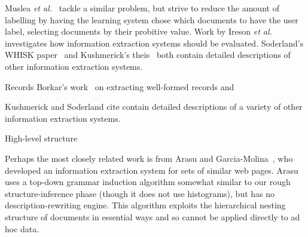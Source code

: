 Muslea {\em et al.}~\cite{muslea+:active-learning} tackle a similar
problem, but strive to reduce the amount of labelling by having the
learning system chose which documents to have the user label,
selecting documents by their probitive value.  Work by Ireson {\em et
al.}~\cite{ireson+:ml-evaluation} investigates how information
extraction systems should be evaluated.  Soderland's WHISK
paper~\cite{soderland:whisk} and Kushmerick's
theis~\cite{kushmerick-phd1997} both contain detailed descriptions of
other information extraction systems.




Records
Borkar's work~\cite{borkar+:text-segmentation} on extracting well-formed
records and 

Kushmerick and Soderland cite contain detailed descriptions of a
variety of other information extraction systems.

High-level structure

Perhaps the most closely related work is from Arasu and 
Garcia-Molina~\cite{arasu+:sigmod03}, who developed an information
extraction system for sets of similar web pages.  
Arasu uses a top-down grammar induction
algorithm somewhat similar to our rough structure-inference phase
(though it does not use histograms),
but has no description-rewriting engine.  
This algorithm exploits the hierarchical nesting
structure of \xml{} documents in essential ways
and so cannot be applied directly to ad hoc data.  





